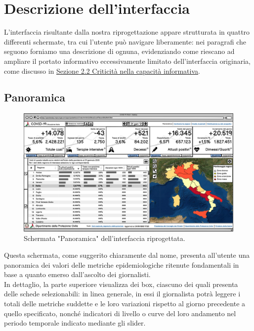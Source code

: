 \documentclass[../../main.tex]{subfiles}
\begin{document}
\clearpage
\section{Descrizione dell'interfaccia}
L'interfaccia risultante dalla nostra riprogettazione appare strutturata in quattro differenti schermate, tra cui l'utente può navigare liberamente: nei paragrafi che seguono forniamo una descrizione di ognuna, evidenziando come riescano ad ampliare il portato informativo eccessivamente limitato dell'interfaccia originaria, come discusso in \hyperref[ss:criticita-informative]{Sezione 2.2 Criticità nella capacità informativa}.

\subsection{Panoramica}
\begin{figure}[h]
    \centering
    \includegraphics[width = \textwidth]{res/img/1 - Panoramica}
    \caption{Schermata "Panoramica" dell'interfaccia riprogettata.}
    \label{fig:panoramica}
\end{figure}

Questa schermata, come suggerito chiaramente dal nome, presenta all'utente una panoramica dei valori delle metriche epidemiologiche ritenute fondamentali in base a quanto emerso dall'ascolto dei giornalisti.\\
In dettaglio, la parte superiore visualizza dei box, ciascuno dei quali presenta delle schede selezionabili: in linea generale, in essi il giornalista potrà leggere i totali delle metriche suddette e le loro variazioni rispetto al giorno precedente a quello specificato, nonché indicatori di livello o curve del loro andamento nel periodo temporale indicato mediante gli slider.\\
\end{document}
